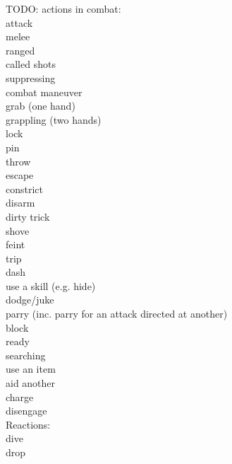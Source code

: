 \documentclass[letterpaper,titlepage,openany,twocolumn]{book}
\begin{document}
TODO: actions in combat:\\
	attack\\
		melee\\
		ranged\\
		called shots\\
		suppressing\\
	combat maneuver\\
		grab (one hand)\\
		grappling (two hands)\\
			lock\\
			pin\\
			throw\\
			escape\\
			constrict\\
		disarm\\
		dirty trick\\
		shove\\
		feint\\
		trip\\
	dash\\
	use a skill (e.g. hide)\\
	dodge/juke\\
	parry (inc. parry for an attack directed at another)\\
	block\\
	ready\\
	searching\\
	use an item\\
	aid another\\
	charge\\
	disengage\\
	Reactions:\\
		dive\\
		drop\\
\end{document}
